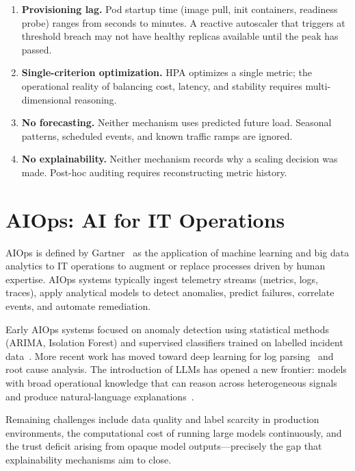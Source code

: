 \begin{enumerate}
  \item \textbf{Provisioning lag.} Pod startup time (image pull, init containers,
  readiness probe) ranges from seconds to minutes. A reactive autoscaler that
  triggers at threshold breach may not have healthy replicas available until the
  peak has passed.

  \item \textbf{Single-criterion optimization.} HPA optimizes a single metric;
  the operational reality of balancing cost, latency, and stability requires
  multi-dimensional reasoning.

  \item \textbf{No forecasting.} Neither mechanism uses predicted future load.
  Seasonal patterns, scheduled events, and known traffic ramps are ignored.

  \item \textbf{No explainability.} Neither mechanism records why a scaling
  decision was made. Post-hoc auditing requires reconstructing metric history.
\end{enumerate}

\section{AIOps: AI for IT Operations}
\label{sec:aiops}

\gls{AIOps} is defined by Gartner~\cite{GartnerAIOpsDefinition} as the application
of machine learning and big data analytics to IT operations to augment or replace
processes driven by human expertise. AIOps systems typically ingest telemetry
streams (metrics, logs, traces), apply analytical models to detect anomalies,
predict failures, correlate events, and automate remediation.

Early AIOps systems focused on anomaly detection using statistical methods
(ARIMA, Isolation Forest) and supervised classifiers trained on labelled incident
data~\cite{zhang2019robust}. More recent work has moved toward deep learning
for log parsing~\cite{du2017deeplog} and root cause analysis. The introduction
of \glspl{LLM} has opened a new frontier: models with broad operational knowledge
that can reason across heterogeneous signals and produce natural-language
explanations~\cite{cheng2023ai}.

Remaining challenges include data quality and label scarcity in production
environments, the computational cost of running large models continuously, and
the trust deficit arising from opaque model outputs—precisely the gap that
explainability mechanisms aim to close.

